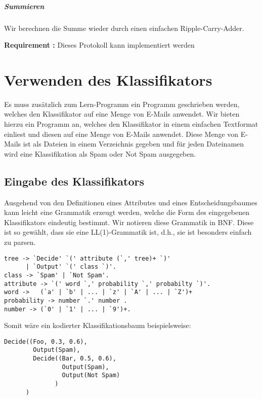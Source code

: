 \documentclass{article}
\newcounter{requirementscount}{}
\newcommand{\requirement}[1] {
        \addtocounter{requirementscount}{1}
        {\bf Requirement \therequirementscount:} #1\\
    }
\begin{document}
\subparagraph{Summieren}
Wir berechnen die Summe wieder durch einen einfachen Ripple-Carry-Adder.

\requirement{Dieses Protokoll kann implementiert werden}

\pagebreak  %
\section{Verwenden des Klassifikators}
Es muss zus\"atzlich zum Lern-Programm ein Programm geschrieben
werden, welches den Klassifikator auf eine Menge von E-Mails anwendet.
Wir bieten hierzu ein Programm an, welches den Klassifikator in einem
einfachen Textformat einliest und diesen auf eine Menge von E-Mails
anwendet. Diese Menge von E-Mails ist als Dateien in einem Verzeichnis
gegeben und f\"ur jeden Dateinamen wird eine Klassifikation als Spam
oder Not Spam ausgegeben.
\subsection{Eingabe des Klassifikators}
Ausgehend von den Definitionen eines Attributes und eines Entscheidungsbaumes
kann leicht eine Grammatik erzeugt werden, welche die Form des eingegebenen
Klassifikators eindeutig bestimmt. Wir notieren diese Grammatik in BNF. Diese
ist so gew\"ahlt, dass sie eine LL(1)-Grammatik ist, d.h., sie ist besonders
einfach zu parsen.\\
\begin{verbatim}
tree -> `Decide' `(' attribute (`,' tree)+ `)'
      | `Output' `(' class `)'.
class -> `Spam' | `Not Spam'.
attribute -> `(' word `,' probability `,' probabilty `)'.
word ->   (`a' | `b' | ... | `z' | `A' | ... | `Z')+
probability -> number `.' number .
number -> (`0' | `1' | ... | `9')+.
\end{verbatim}

Somit w\"are ein kodierter Klassifikationsbaum beispielsweise:
\begin{verbatim}
Decide((Foo, 0.3, 0.6),
        Output(Spam), 
        Decide((Bar, 0.5, 0.6), 
                Output(Spam), 
                Output(Not Spam)
              )
      )
\end{verbatim}
\end{document}
